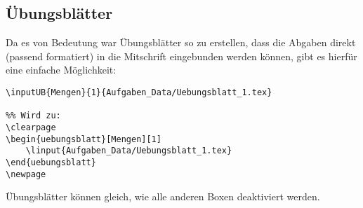 \subsection{Übungsblätter}
Da es von Bedeutung war Übungsblätter so zu erstellen, dass die Abgaben direkt (passend formatiert) in die Mitschrift eingebunden werden können, gibt es hierfür eine einfache Möglichkeit:
\begin{lstlisting}[style=latex]
%% \inputUB{<Name>}{<Nummer>}{<Pfad - linput>}
\inputUB{Mengen}{1}{Aufgaben_Data/Uebungsblatt_1.tex} 

%% Wird zu: 
\clearpage
\begin{uebungsblatt}[Mengen][1]
    \linput{Aufgaben_Data/Uebungsblatt_1.tex}
\end{uebungsblatt}
\newpage
\end{lstlisting}
Übungsblätter können gleich, wie alle anderen Boxen deaktiviert werden.


\clearpage
